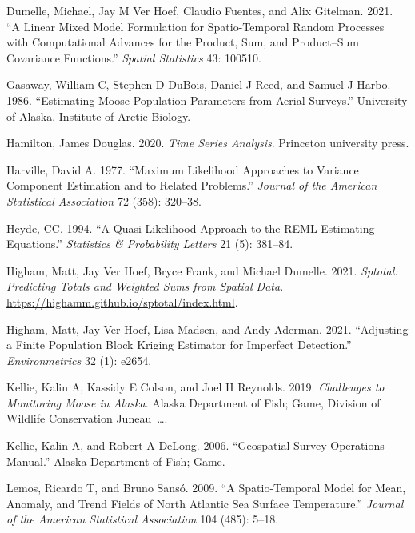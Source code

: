 \documentclass[smallextended]{svjour3}       %
\newlength{\cslhangindent}
\newlength{\cslentryspacingunit} %
\newenvironment{CSLReferences}[2] %
 {%
  \setlength{\parindent}{0pt}
  \ifodd #1
  \let\oldpar\par
  \def\par{\hangindent=\cslhangindent\oldpar}
  \fi
  \setlength{\parskip}{#2\cslentryspacingunit}
 }%
 {}
\begin{document}
\begin{CSLReferences}{1}{0}
\leavevmode{}%
Dumelle, Michael, Jay M Ver Hoef, Claudio Fuentes, and Alix Gitelman.
2021. {``A Linear Mixed Model Formulation for Spatio-Temporal Random
Processes with Computational Advances for the Product, Sum, and
Product--Sum Covariance Functions.''} \emph{Spatial Statistics} 43:
100510.

\leavevmode{}%
Gasaway, William C, Stephen D DuBois, Daniel J Reed, and Samuel J Harbo.
1986. {``Estimating Moose Population Parameters from Aerial Surveys.''}
University of Alaska. Institute of Arctic Biology.

\leavevmode{}%
Hamilton, James Douglas. 2020. \emph{Time Series Analysis}. Princeton
university press.

\leavevmode{}%
Harville, David A. 1977. {``Maximum Likelihood Approaches to Variance
Component Estimation and to Related Problems.''} \emph{Journal of the
American Statistical Association} 72 (358): 320--38.

\leavevmode{}%
Heyde, CC. 1994. {``A Quasi-Likelihood Approach to the REML Estimating
Equations.''} \emph{Statistics \& Probability Letters} 21 (5): 381--84.

\leavevmode{}%
Higham, Matt, Jay Ver Hoef, Bryce Frank, and Michael Dumelle. 2021.
\emph{Sptotal: Predicting Totals and Weighted Sums from Spatial Data}.
\url{https://highamm.github.io/sptotal/index.html}.

\leavevmode{}%
Higham, Matt, Jay Ver Hoef, Lisa Madsen, and Andy Aderman. 2021.
{``Adjusting a Finite Population Block Kriging Estimator for Imperfect
Detection.''} \emph{Environmetrics} 32 (1): e2654.

\leavevmode{}%
Kellie, Kalin A, Kassidy E Colson, and Joel H Reynolds. 2019.
\emph{Challenges to Monitoring Moose in Alaska}. Alaska Department of
Fish; Game, Division of Wildlife Conservation Juneau~\ldots.

\leavevmode{}%
Kellie, Kalin A, and Robert A DeLong. 2006. {``Geospatial Survey
Operations Manual.''} Alaska Department of Fish; Game.

\leavevmode{}%
Lemos, Ricardo T, and Bruno Sansó. 2009. {``A Spatio-Temporal Model for
Mean, Anomaly, and Trend Fields of North Atlantic Sea Surface
Temperature.''} \emph{Journal of the American Statistical Association}
104 (485): 5--18.


\end{CSLReferences}
\end{document}
